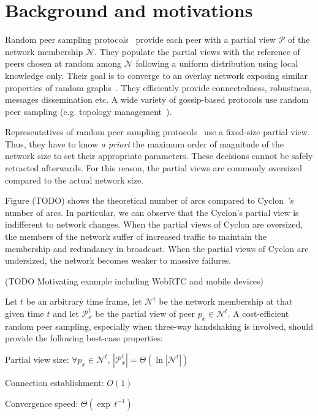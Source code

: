 
\section{Background and motivations}
\label{sec:background}

Random peer sampling protocols~\cite{jelasity2004peer} provide each peer with a
partial view $\mathcal{P}$ of the network membership $\mathcal{N}$. They
populate the partial views with the reference of peers chosen at random among
$\mathcal{N}$ following a uniform distribution using local knowledge
only. Their goal is to converge to an overlay network exposing similar
properties of random graphs~\cite{erdos1959random}. They efficiently provide
connectedness, robustness, messages dissemination etc. A wide variety of
gossip-based protocols use random peer sampling (e.g. topology
management~\cite{voulgaris2005epidemic, jelasity2009tman, dabek2004vivaldi}).

Representatives of random peer sampling protocols~\cite{voulgaris2005cyclon,
  eugster2003lightweight, tolgyeski2009adaptive} use a fixed-size partial view.
Thus, they have to know \emph{a priori} the maximum order of magnitude of the
network size to set their appropriate parameters. These decisions cannot be
safely retracted afterwards. For this reason, the partial views are commonly
oversized compared to the actual network size.

Figure (TODO) shows the theoretical number of arcs compared to
Cyclon~\cite{voulgaris2005cyclon}'s number of arcs. In particular, we can
observe that the Cyclon's partial view is indifferent to network changes.  When
the partial views of Cyclon are oversized, the members of the network suffer of
increased traffic to maintain the membership and redundancy in broadcast. When
the partial views of Cyclon are undersized, the network becomes weaker to
massive failures.

(TODO Motivating example including WebRTC and mobile devices)

\begin{problem}
  Let $t$ be an arbitrary time frame, let $\mathcal{N}^t$ be the network
  membership at that given time $t$ and let $\mathcal{P}_x^t$ be the partial
  view of peer $p_x \in \mathcal{N}^t$.  A cost-efficient random peer sampling,
  especially when three-way handshaking is involved, should provide the
  following best-case properties:
  \begin{center}
    Partial view size: \hfill
    $\forall p_x \in \mathcal{N}^t,\, |\mathcal{P}_x^t| = \Theta (\ln
    |\mathcal{N}^t|)$
  \end{center}
  \begin{center}
    Connection establishment: \hfill $O(1)$
  \end{center}
  \begin{center}
    Convergence speed: \hfill $\Theta(\exp \, t^{-1})$
  \end{center}
\end{problem}

